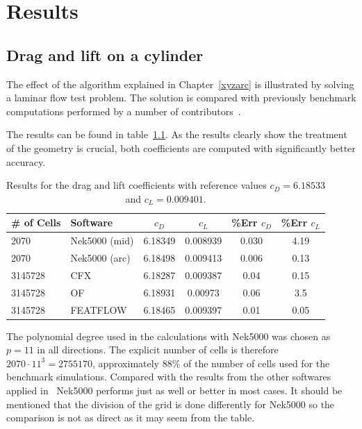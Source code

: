 
\chapter{Results} %

\label{results} %



\section{Drag and lift on a cylinder}
The effect of the algorithm explained in Chapter~\ref{xyzarc} is
illustrated by solving a laminar flow test problem. 
The solution is compared with previously benchmark computations performed by a number of 
contributors~\cite{benchmark}. 

The results can be found in 
table~\ref{tab:testcase}. As the results clearly show the treatment of the geometry is 
crucial, both coefficients are computed with significantly better accuracy. 
%
\begin{table}
\centering
\begin{tabular}{l l c c c c}
		\toprule
		\# of Cells & Software & $c_D$ & $c_L$ & \%\textbf{Err} $c_D$ &\%\textbf{Err} $c_L$ \\ \midrule 
		2070 & Nek5000 (mid) & 6.18349 & 0.008939 & 0.030 & 4.19 \\ 
		2070 & Nek5000 (arc) & 6.18498 & 0.009413 & 0.006 & 0.13 \\
		3145728 & CFX 		 & 6.18287 & 0.009387 & 0.04 &0.15 \\
		3145728 & OF	     & 6.18931 & 0.00973 & 0.06 &3.5 \\
		3145728 & FEATFLOW   & 6.18465 & 0.009397 & 0.01 &0.05 \\
		\bottomrule	
	\end{tabular}
	\caption{Results for the drag and lift coefficients with reference values 
	$c_D = 6.18533$ and $c_L = 0.009401$.}
\label{tab:testcase}
\end{table}
%
The polynomial degree used in the calculations with Nek5000 was chosen as $p = 11 $ 
in all directions. The explicit number of cells is therefore $2070\cdot11^{3} = 2755170$,
approximately $88\%$ of the number of cells used for the benchmark simulations. Compared 
with the results from the other softwares applied in~\cite{benchmark} Nek5000 performs 
just as well or better in most cases. It should be mentioned that the division of the grid is done 
differently for Nek5000 so the comparison is not as direct as it may seem from the table.

